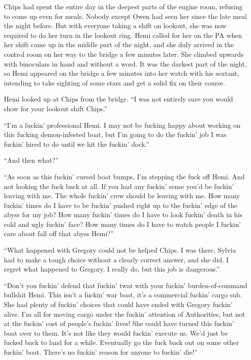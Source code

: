 \documentclass[]{scrbook}
\begin{document}
Chips had spent the entire day in the deepest parts of the engine room,
refusing to come up even for meals. Nobody except Owen had seen her
since the late meal the night before. But with everyone taking a shift
on lookout, she was now required to do her turn in the lookout ring.
Hemi called for her on the PA when her shift came up in the middle part
of the night, and she duly arrived in the control room on her way to the
bridge a few minutes later. She climbed upwards with binoculars in hand
and without a word. It was the darkest part of the night, so Hemi
appeared on the bridge a few minutes into her watch with his sextant,
intending to take sighting of some stars and get a solid fix on their
course.

Hemi looked up at Chips from the bridge. ``I was not entirely sure you
would show for your lookout shift Chips.''

``I'm a fuckin' professional Hemi. I may not be fucking happy about
working on this fucking demon-infested boat, but I'm going to do the
fuckin' job I was fuckin' hired to do until we hit the fuckin' dock.''

``And then what?''

``As soon as this fuckin' cursed boat bumps, I'm stepping the fuck off
Hemi. And not looking the fuck back at all. If you had any fuckin' sense
you'd be fuckin' leaving with me. The whole fuckin' crew should be
leaving with me. How many fuckin' times do I have to be fuckin' pushed
right up to the fuckin' edge of the abyss for my job? How many fuckin'
times do I have to look fuckin' death in his cold and ugly fuckin' face?
How many times do I have to watch people I fuckin' care about fall off
that abyss Hemi?''

``What happened with Gregory could not be helped Chips. I was there,
Sylvia had to make a tough choice without a clearly correct answer, and
she did. I regret what happened to Gregory, I really do, but this job is
dangerous.''

``Don't you fuckin' defend that fuckin' twat with your fuckin'
burden-of-command bullshit Hemi. This isn't a fuckin' war boat, it's a
commercial fuckin' cargo sub. She had plenty of fuckin' choices that
could have ended with Gregory fuckin' alive. I'm all for moving cargo
under the fuckin' attention of Authorities, but not at the fuckin' cost
of people's fuckin' lives! She could have turned this fuckin' boat over
to them. It's not like they would fuckin' execute us. We'd just be
fucked back to land for a while. Eventually go the fuck back out on some
other fuckin' boat. There's no fuckin' reason for anyone to fuckin'
die!''
\end{document}
